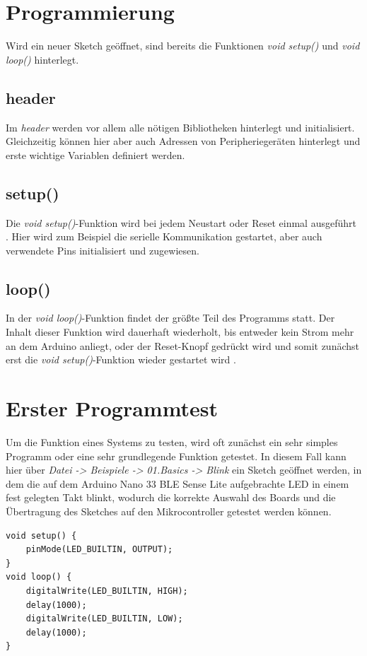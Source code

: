 \section{Programmierung}
Wird ein neuer Sketch geöffnet, sind bereits die Funktionen \textit{void setup()} und \textit{void loop()} hinterlegt.

\subsection{header}
Im \textit{header} werden vor allem alle nötigen Bibliotheken hinterlegt und initialisiert. Gleichzeitig können hier aber auch Adressen von Peripheriegeräten hinterlegt und erste wichtige Variablen definiert werden.

\subsection{setup()}
Die \textit{void setup()}-Funktion wird bei jedem Neustart oder Reset einmal ausgeführt \cite{ArdIDE.2024d}.
Hier wird zum Beispiel die serielle Kommunikation gestartet, aber auch verwendete Pins initialisiert und zugewiesen.

\subsection{loop()}
In der \textit{void loop()}-Funktion findet der größte Teil des Programms statt. Der Inhalt dieser Funktion wird dauerhaft wiederholt, bis entweder kein Strom mehr an dem Arduino anliegt, oder der Reset-Knopf gedrückt wird und somit zunächst erst die \textit{void setup()}-Funktion wieder gestartet wird \cite{ArdIDE.2024e}.

\section{Erster Programmtest}
Um die Funktion eines Systems zu testen, wird oft zunächst ein sehr simples Programm oder eine sehr grundlegende Funktion getestet.
In diesem Fall kann hier über \textit{Datei -> Beispiele -> 01.Basics -> Blink} ein Sketch geöffnet werden, in dem die auf dem Arduino Nano 33 BLE Sense Lite aufgebrachte LED in einem fest gelegten Takt blinkt, wodurch die korrekte Auswahl des Boards und die Übertragung des Sketches auf den Mikrocontroller getestet werden können.

\begin{lstlisting}
void setup() {
	pinMode(LED_BUILTIN, OUTPUT);
}
void loop() {
	digitalWrite(LED_BUILTIN, HIGH);
	delay(1000);                     
	digitalWrite(LED_BUILTIN, LOW);  
	delay(1000);                     
}
\end{lstlisting}

